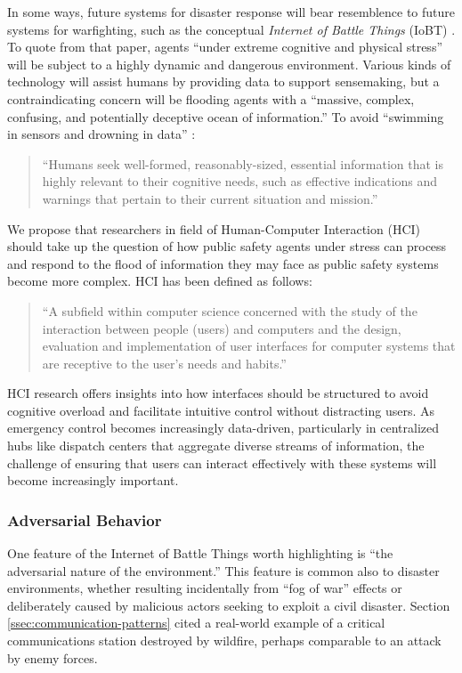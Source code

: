 \documentclass[]             %
{NASA}                       %
\theoremstyle{definition}
\begin{document}
In some ways, future systems for disaster response will bear
resemblence to future systems for warfighting, such as the conceptual
\emph{Internet of Battle Things} (IoBT) \cite{2016:iobt}. To quote
from that paper, agents ``under extreme cognitive and physical
stress'' will be subject to a highly dynamic and dangerous
environment. Various kinds of technology will assist humans by
providing data to support sensemaking, but a contraindicating concern
will be flooding agents with a ``massive, complex, confusing, and
potentially deceptive ocean of information.'' To avoid ``swimming in
sensors and drowning in data'' \cite{2010:magnuson}:
\begin{quote}
``Humans seek well-formed, reasonably-sized, essential information
  that is highly relevant to their cognitive needs, such as effective
  indications and warnings that pertain to their current situation and
  mission.'' \cite{2016:iobt}
\end{quote}

We propose that researchers in field of Human-Computer Interaction
(HCI) should take up the question of how public safety agents under
stress can process and respond to the flood of information they may
face as public safety systems become more complex. HCI has been
defined as follows:
\begin{quote}
  ``A subfield within computer science concerned with the study of the
  interaction between people (users) and computers and the design,
  evaluation and implementation of user interfaces for computer
  systems that are receptive to the user's needs and habits.'' \cite{2009:hci-definition}
\end{quote}
HCI research offers insights into how interfaces should be structured
to avoid cognitive overload and facilitate intuitive control without
distracting users. As emergency control becomes increasingly
data-driven, particularly in centralized hubs like dispatch centers
that aggregate diverse streams of information, the challenge of
ensuring that users can interact effectively with these systems will
become increasingly important.

\subsubsection{Adversarial Behavior}
One feature of the Internet of Battle Things worth highlighting is
``the adversarial nature of the environment.'' This feature is common
also to disaster environments, whether resulting incidentally from
``fog of war'' effects or deliberately caused by malicious actors
seeking to exploit a civil disaster. Section
\ref{ssec:communication-patterns} cited a real-world example of a
critical communications station destroyed by wildfire, perhaps
comparable to an attack by enemy forces.
\end{document}
